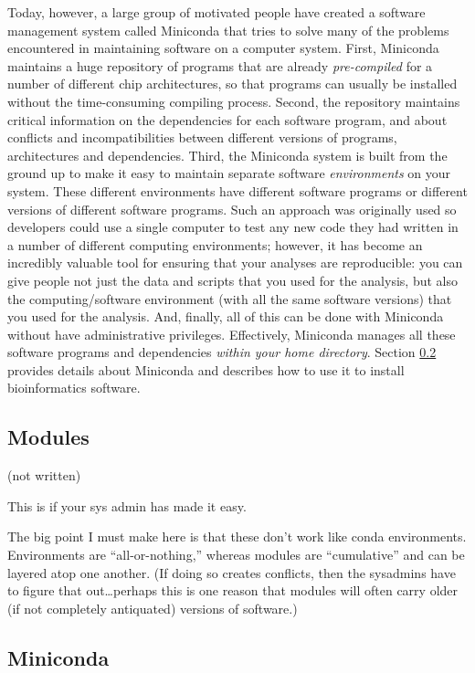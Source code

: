 \documentclass[]{krantz}
\begin{document}
Today, however, a large group of motivated people have created a software management
system called Miniconda that tries to solve many of the problems encountered in maintaining
software on a computer system. First, Miniconda maintains a huge repository of
programs that are already \emph{pre-compiled} for a number of different chip architectures, so that
programs can usually be installed without the time-consuming compiling process. Second, the repository
maintains critical information on the dependencies for each software program, and about
conflicts and incompatibilities between different versions of programs, architectures and
dependencies. Third, the Miniconda system is built from the ground up to make it easy to maintain
separate software \emph{environments} on your system. These different environments have different
software programs or different versions of different software programs. Such an approach
was originally used so developers could use a single computer to test any new code
they had written in a number of different
computing environments; however, it has become an incredibly valuable tool for ensuring
that your analyses are reproducible: you can give people not just the data and scripts that you
used for the analysis, but also the computing/software environment (with all the same
software versions) that you used for the analysis. And, finally, all of this
can be done with Miniconda without have administrative privileges. Effectively,
Miniconda manages all these software programs and dependencies \emph{within your home directory}.
Section \ref{miniconda} provides details about Miniconda and describes how to use it
to install bioinformatics software.

\hypertarget{modules}{%
\subsection{Modules}\label{modules}}

(not written)

This is if your sys admin has made it easy.

The big point I must make here is that these don't work like conda environments.
Environments are ``all-or-nothing,'' whereas modules are ``cumulative'' and can be
layered atop one another. (If doing so creates conflicts, then the sysadmins have to
figure that out\ldots{}perhaps this is one reason that modules will often carry older (if not
completely antiquated) versions of software.)

\hypertarget{miniconda}{%
\subsection{Miniconda}\label{miniconda}}
\end{document}
